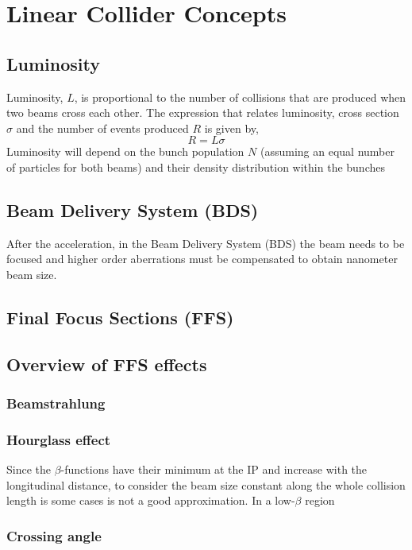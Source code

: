 \chapter{Linear Collider Concepts}
\section{Luminosity}
Luminosity, $L$, is proportional to the number of collisions that are produced when two beams cross each other. The expression that relates luminosity, cross section $\sigma$ and the number of events produced $R$ is given by,
\begin{equation}
 R=L\sigma
\end{equation}
Luminosity will depend on the bunch population 	$N$ (assuming an equal number of particles for both beams) and their density distribution within the bunches 
\section{Beam Delivery System (BDS)}
After the acceleration, in the Beam Delivery System (BDS) the beam needs to be focused and higher order aberrations must be compensated to obtain nanometer beam size. 
\section{Final Focus Sections (FFS)}
\section{Overview of FFS effects}
\subsection{Beamstrahlung}
\subsection{Hourglass effect}
Since the $\beta$-functions have their minimum at the IP and increase with the longitudinal distance, to consider the beam size constant along the whole collision length is some cases is not a good approximation. In a low-$\beta$ region 
\subsection{Crossing angle}
